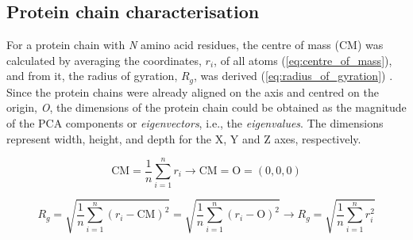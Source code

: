 \subsection{Protein chain characterisation}

For a protein chain with \textit{N} amino acid residues, the centre of mass (CM) was calculated by averaging the coordinates, $r_{i}$, of all atoms (\autoref{eq:centre_of_mass}), and from it, the radius of gyration, $R_{g}$, was derived (\autoref{eq:radius_of_gyration}) \cite{FIXMAN_1962_ROG}. Since the protein chains were already aligned on the axis and centred on the origin, \textit{O}, the dimensions of the protein chain could be obtained as the magnitude of the PCA components or \textit{eigenvectors}, i.e., the \textit{eigenvalues}. The dimensions represent width, height, and depth for the X, Y and Z axes, respectively.

\begin{equation}
\text{CM} = \frac{1}{n} \sum_{i=1}^{n} r_i \rightarrow \text{CM} = \text{O} = (0,0,0)
\label{eq:centre_of_mass}
\end{equation}

\vspace{-12pt} %
\vspace{-6pt} %

\begin{equation}
R_g = \sqrt{\frac{1}{n} \sum_{i=1}^{n} (r_i - \text{CM})^2} = \sqrt{\frac{1}{n} \sum_{i=1}^{n} (r_i - \text{O})^2} \rightarrow R_g = \sqrt{\frac{1}{n} \sum_{i=1}^{n} r_i^2}
\label{eq:radius_of_gyration}
\end{equation}

